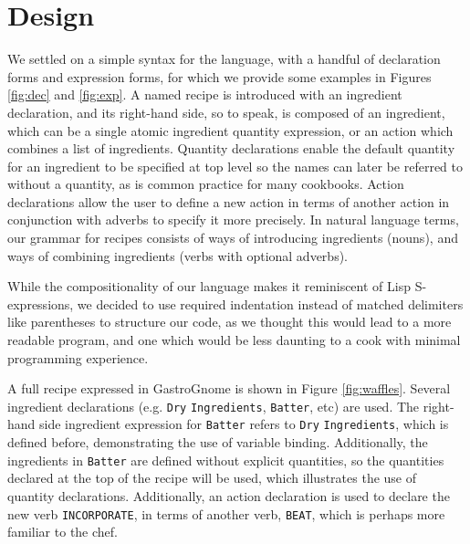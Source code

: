 \documentclass[pldi]{sigplanconf-pldi15}
\begin{document}
\section{Design}
We settled on a simple syntax for the language, with a handful of declaration
forms and expression forms, for which we provide some examples in Figures
\ref{fig:dec} and \ref{fig:exp}. A named recipe is introduced with an ingredient declaration, and its right-hand side, so to speak, is composed of an ingredient,
which can be a single atomic ingredient quantity expression, or an action which
combines a list of ingredients. Quantity declarations enable the default
quantity for an ingredient to be specified at top level so the names can later
be referred to without a quantity, as is common practice for many cookbooks.
Action declarations allow the user to define a new action in terms of another
action in conjunction with adverbs to specify it more precisely. In natural
language terms, our grammar for recipes consists of ways of introducing
ingredients (nouns), and ways of combining ingredients (verbs with optional
adverbs).

While the compositionality of our language makes it reminiscent of Lisp
S-expressions, we decided to use required indentation instead of matched
delimiters like parentheses to structure our code, as we thought this would
lead to a more readable program, and one which would be less daunting to a
cook with minimal programming experience.

A full recipe expressed in GastroGnome is shown in Figure \ref{fig:waffles}.
Several ingredient declarations (e.g. \texttt{Dry} \texttt{Ingredients},
\texttt{Batter}, etc) are used.  The right-hand side ingredient expression for
\texttt{Batter} refers to \texttt{Dry} \texttt{Ingredients}, which is defined
before, demonstrating the use of variable binding. Additionally, the
ingredients in \texttt{Batter} are defined without explicit quantities, so the
quantities declared at the top of the recipe will be used, which illustrates
the use of quantity declarations.  Additionally, an action declaration is used
to declare the new verb \texttt{INCORPORATE}, in terms of another verb,
\texttt{BEAT}, which is perhaps more familiar to the chef.
\end{document}

